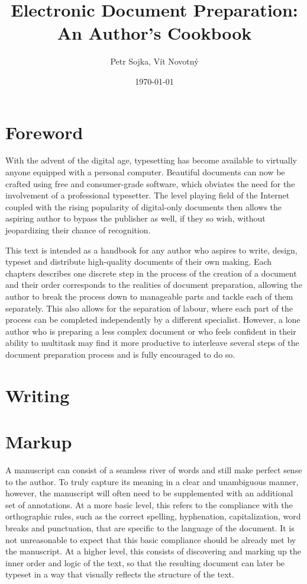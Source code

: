 \documentclass[b5paper]{book}
\title{Electronic Document Preparation: An Author's Cookbook}
\author{Petr Sojka, Vít Novotný}
\date{\today}
\begin{document}
  \frontmatter
    \maketitle
    \tableofcontents
  \mainmatter
    \chapter{Foreword}
      With the advent of the digital age, typesetting has become available to
      virtually anyone equipped with a personal computer. Beautiful documents
      can now be crafted using free and consumer-grade software, which obviates
      the need for the involvement of a professional typesetter. The level
      playing field of the Internet coupled with the rising popularity of
      digital-only documents then allows the aspiring author to bypass the
      publisher as well, if they so wish, without jeopardizing their chance of
      recognition.
      
      This text is intended as a handbook for any author who aspires to write,
      design, typeset and distribute high-quality documents of their own making.
      Each chapters describes one discrete step in the process of the creation
      of a document and their order corresponds to the realities of document
      preparation, allowing the author to break the process down to manageable
      parts and tackle each of them separately. This also allows for the
      separation of labour, where each part of the process can be completed
      independently by a different specialist. However, a lone author who is
      preparing a less complex document or who feels confident in their ability
      to multitask may find it more productive to interleave several steps of
      the document preparation process and is fully encouraged to do so.

    \chapter{Writing}

    \chapter{Markup}
      A manuscript can consist of a seamless river of words and still make
      perfect sense to the author. To truly capture its meaning in a clear and
      unambiguous manner, however, the manuscript will often need to be
      supplemented with an additional set of annotations. At a more basic level,
      this refers to the compliance with the orthographic rules, such as the
      correct spelling, hyphenation, capitalization, word breaks and
      punctuation, that are specific to the language of the document. It is not
      unreasonable to expect that this basic compliance should be already met by
      the manuscript. At a higher level, this consists of discovering and
      marking up the inner order and logic of the text, so that the resulting
      document can later be typeset in a way that visually reflects the
      structure of the text.
      
\end{document}
